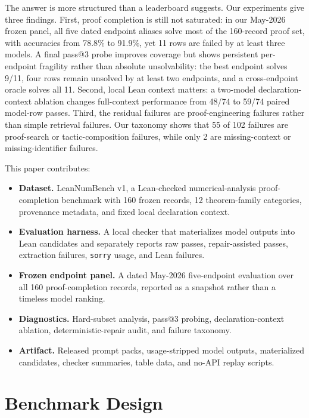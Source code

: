 \documentclass{article}
\begin{document}
The answer is more structured than a leaderboard suggests. Our experiments
give three findings. First, proof completion is still not saturated: in our
May-2026 frozen panel, all five dated endpoint aliases solve most of the
160-record proof set, with accuracies from 78.8\% to 91.9\%, yet 11 rows are
failed by at least three models. A final pass@3 probe improves coverage but
shows persistent per-endpoint fragility rather than absolute unsolvability:
the best endpoint solves 9/11, four rows remain unsolved by at least two
endpoints, and a cross-endpoint oracle solves all 11. Second, local Lean context matters:
a two-model declaration-context ablation changes full-context performance
from 48/74 to 59/74 paired model-row passes.
Third, the residual failures are proof-engineering failures rather than
simple retrieval failures. Our taxonomy shows that 55 of 102 failures are
proof-search or tactic-composition failures, while only 2 are missing-context
or missing-identifier failures.

This paper contributes:

\begin{itemize}
\item \textbf{Dataset.} LeanNumBench v1, a Lean-checked numerical-analysis
proof-completion benchmark with 160 frozen records, 12 theorem-family
categories, provenance metadata, and fixed local declaration context.
\item \textbf{Evaluation harness.} A local checker that materializes model
outputs into Lean candidates and separately reports raw passes,
repair-assisted passes, extraction failures, \texttt{sorry} usage, and Lean
failures.
\item \textbf{Frozen endpoint panel.} A dated May-2026 five-endpoint evaluation
over all 160 proof-completion records, reported as a snapshot rather than a
timeless model ranking.
\item \textbf{Diagnostics.} Hard-subset analysis, pass@3 probing,
declaration-context ablation, deterministic-repair audit, and failure taxonomy.
\item \textbf{Artifact.} Released prompt packs, usage-stripped model outputs,
materialized candidates, checker summaries, table data, and no-API replay
scripts.
\end{itemize}



\section{Benchmark Design}
\end{document}
